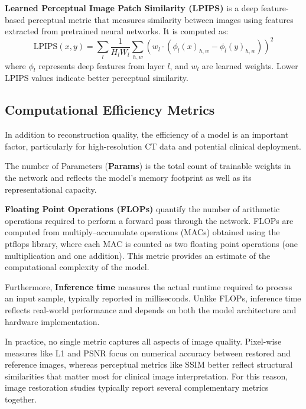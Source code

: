 \textbf{Learned Perceptual Image Patch Similarity (LPIPS)} is a deep feature-based perceptual metric that measures similarity between images using features extracted from pretrained neural networks. It is computed as:
\begin{equation}
\mathrm{LPIPS}(x, y) =
\sum_{l} \frac{1}{H_l W_l}
\sum_{h,w} 
\left( w_l \cdot \left( \phi_l(x)_{h,w} - \phi_l(y)_{h,w} \right) \right)^2
\end{equation}
where $\phi_l$ represents deep features from layer $l$, and $w_l$ are learned weights. Lower LPIPS values indicate better perceptual similarity.
 
 


\subsection{Computational Efficiency Metrics}

In addition to reconstruction quality, the efficiency of a model is an important factor, particularly for high-resolution CT data and potential clinical deployment. 

The number of Parameters (\textbf{Params}) is the total count of trainable weights in the network and reflects the model’s memory footprint as well as its representational capacity.

\textbf{Floating Point Operations (FLOPs)} quantify the number of arithmetic operations required to perform a forward pass through the network. FLOPs are computed from multiply–accumulate operations (MACs) obtained using the ptflops library, where each MAC is counted as two floating point operations (one multiplication and one addition). This metric provides an estimate of the computational complexity of the model.

Furthermore, \textbf{Inference time }measures the actual runtime required to process an input sample, typically reported in milliseconds. Unlike FLOPs, inference time reflects real-world performance and depends on both the model architecture and hardware implementation.




In practice, no single metric captures all aspects of image quality. Pixel-wise measures like L1 and PSNR focus on numerical accuracy between restored and reference images, whereas perceptual metrics like SSIM better reflect structural similarities that matter most for clinical image interpretation. For this reason, image restoration studies typically report several complementary metrics together. 
\begin{quote}


\end{quote}

 

\begin{quote}


\end{quote}

\begin{quote}


\end{quote}

 

\begin{quote}


\end{quote}

\begin{quote}


\end{quote}

 


